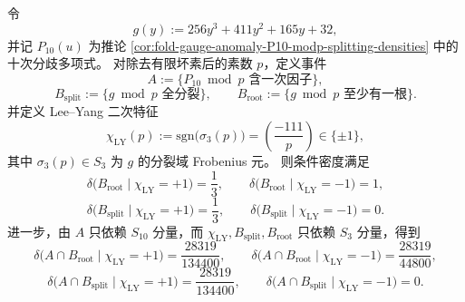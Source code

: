 \begin{theorem}\label{thm:xi-leyang-sign-conditional-root-collapse}
令
\[
g(y):=256y^3+411y^2+165y+32,
\]
并记 \(P_{10}(u)\) 为推论 \ref{cor:fold-gauge-anomaly-P10-modp-splitting-densities} 中的十次分歧多项式。
对除去有限坏素后的素数 \(p\)，定义事件
\[
A:=\{\text{\(P_{10}\bmod p\) 含一次因子}\},
\]
\[
B_{\mathrm{split}}:=\{\text{\(g\bmod p\) 全分裂}\},
\qquad
B_{\mathrm{root}}:=\{\text{\(g\bmod p\) 至少有一根}\}.
\]
并定义 Lee--Yang 二次特征
\[
\chi_{\mathrm{LY}}(p):=\mathrm{sgn}\!\bigl(\sigma_3(p)\bigr)
=
\left(\frac{-111}{p}\right)\in\{\pm1\},
\]
其中 \(\sigma_3(p)\in S_3\) 为 \(g\) 的分裂域 Frobenius 元。
则条件密度满足
\[
\boxed{\;
\delta\!\bigl(B_{\mathrm{root}}\mid \chi_{\mathrm{LY}}=+1\bigr)=\frac13,
\qquad
\delta\!\bigl(B_{\mathrm{root}}\mid \chi_{\mathrm{LY}}=-1\bigr)=1,\;}
\]
\[
\boxed{\;
\delta\!\bigl(B_{\mathrm{split}}\mid \chi_{\mathrm{LY}}=+1\bigr)=\frac13,
\qquad
\delta\!\bigl(B_{\mathrm{split}}\mid \chi_{\mathrm{LY}}=-1\bigr)=0.\;}
\]
进一步，由 \(A\) 只依赖 \(S_{10}\) 分量，而
\(\chi_{\mathrm{LY}},B_{\mathrm{split}},B_{\mathrm{root}}\) 只依赖 \(S_3\) 分量，得到
\[
\boxed{\;
\delta\!\bigl(A\cap B_{\mathrm{root}}\mid \chi_{\mathrm{LY}}=+1\bigr)
=
\frac{28319}{134400},
\qquad
\delta\!\bigl(A\cap B_{\mathrm{root}}\mid \chi_{\mathrm{LY}}=-1\bigr)
=
\frac{28319}{44800},\;}
\]
\[
\boxed{\;
\delta\!\bigl(A\cap B_{\mathrm{split}}\mid \chi_{\mathrm{LY}}=+1\bigr)
=
\frac{28319}{134400},
\qquad
\delta\!\bigl(A\cap B_{\mathrm{split}}\mid \chi_{\mathrm{LY}}=-1\bigr)
=
0.\;}
\]
\end{theorem}
